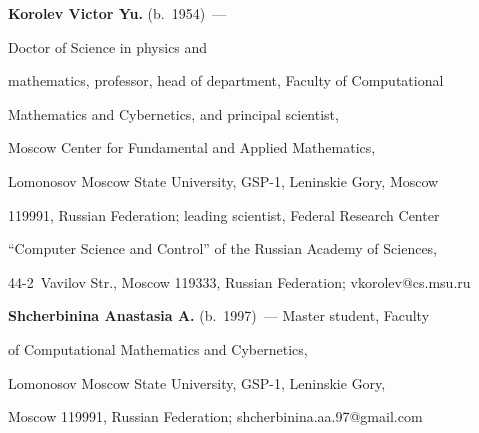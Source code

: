 \noindent

\textbf{Korolev Victor Yu.} (b.\ 1954)~--- 

Doctor of Science in physics and

mathematics, professor, head of department, Faculty of Computational 

Mathematics and Cybernetics, and principal scientist, 

Moscow Center for Fundamental and Applied Mathematics, 

Lomonosov Moscow State University, GSP-1, Leninskie Gory, Moscow 

119991, Russian Federation; leading scientist, Federal Research Center 

``Computer Science and Control'' of the Russian Academy of Sciences, 

44-2~Vavilov Str., Moscow 119333, Russian Federation; \mbox{vkorolev@cs.msu.ru}



\vspace*{3pt}



\noindent

\textbf{Shcherbinina Anastasia A.} (b.\ 1997)~--- Master student,  Faculty

of Computational Mathematics and Cybernetics, 

Lomonosov Moscow State University, GSP-1, Leninskie Gory, 

Moscow 119991, Russian Federation; \mbox{shcherbinina.aa.97@gmail.com}





\label{end\stat}



\renewcommand{\bibname}{\protect\rm Литература} 

